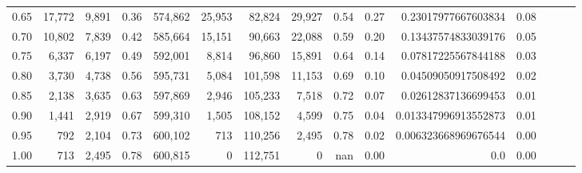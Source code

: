 \begin{tabular}{rrrrrrrrrrrrrrr}
0.65 &  17,772 &   9,891 &  0.36 &  574,862 &   25,953 &   82,824 &   29,927 &  0.54 &  0.27 &   0.23017977667603834 &      0.08 \\
0.70 &  10,802 &   7,839 &  0.42 &  585,664 &   15,151 &   90,663 &   22,088 &  0.59 &  0.20 &   0.13437574833039176 &      0.05 \\
0.75 &   6,337 &   6,197 &  0.49 &  592,001 &    8,814 &   96,860 &   15,891 &  0.64 &  0.14 &   0.07817225567844188 &      0.03 \\
0.80 &   3,730 &   4,738 &  0.56 &  595,731 &    5,084 &  101,598 &   11,153 &  0.69 &  0.10 &   0.04509050917508492 &      0.02 \\
0.85 &   2,138 &   3,635 &  0.63 &  597,869 &    2,946 &  105,233 &    7,518 &  0.72 &  0.07 &   0.02612837136699453 &      0.01 \\
0.90 &   1,441 &   2,919 &  0.67 &  599,310 &    1,505 &  108,152 &    4,599 &  0.75 &  0.04 &  0.013347996913552873 &      0.01 \\
0.95 &     792 &   2,104 &  0.73 &  600,102 &      713 &  110,256 &    2,495 &  0.78 &  0.02 &  0.006323668969676544 &      0.00 \\
1.00 &     713 &   2,495 &  0.78 &  600,815 &        0 &  112,751 &        0 &   nan &  0.00 &                   0.0 &      0.00 \\
\bottomrule
\end{tabular}
